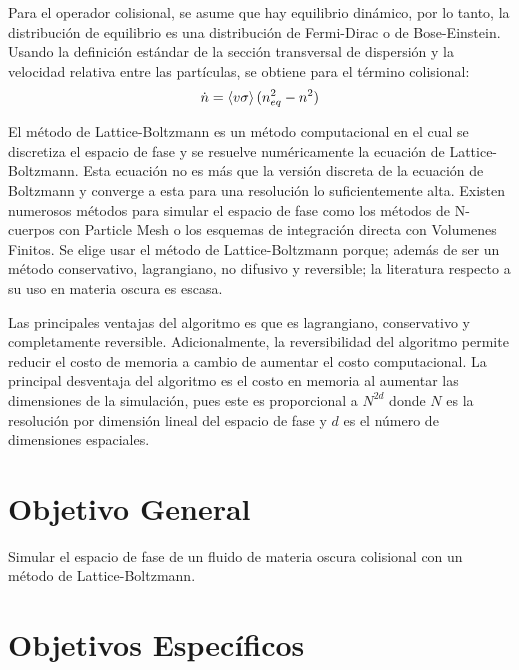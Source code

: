 \documentclass[12pt]{article}
\begin{document}
Para el operador colisional, se asume que hay equilibrio dinámico, por
lo tanto, la distribución de equilibrio es una distribución de
Fermi-Dirac o de Bose-Einstein. Usando la definición estándar de la
sección transversal de dispersión y la velocidad relativa entre las
partículas, se obtiene para el término colisional\cite{mariangela}: 
\begin{equation}
\dot{n} = \expval{v \sigma} (n_{eq}^2 - n^2)
\label{colision}
\end{equation}

El método de Lattice-Boltzmann es un método computacional en el cual se discretiza el espacio de fase y se resuelve numéricamente la ecuación de Lattice-Boltzmann. Esta ecuación no es más que la versión discreta de la ecuación de Boltzmann y converge a esta para una resolución lo suficientemente alta. Existen numerosos métodos para simular el espacio de fase como los métodos de N-cuerpos con Particle Mesh o los esquemas de integración directa con Volumenes Finitos. Se elige usar el método de Lattice-Boltzmann porque; además de ser un método conservativo, lagrangiano, no difusivo y reversible; la literatura respecto a su uso en materia oscura es escasa.

Las principales ventajas del algoritmo es que es lagrangiano, conservativo y completamente reversible.\cite{integerLatticeDynamics} Adicionalmente, la reversibilidad del algoritmo permite reducir el costo de memoria a cambio de aumentar el costo computacional. La principal desventaja del algoritmo es el costo en memoria al aumentar las dimensiones de la simulación, pues este es proporcional a $N^{2d}$ donde $N$ es la resolución por dimensión lineal del espacio de fase y $d$ es el número de dimensiones espaciales.

\section{Objetivo General}


Simular el espacio de fase de un fluido de materia oscura colisional con un método de Lattice-Boltzmann.



\section{Objetivos Específicos}
\end{document}
